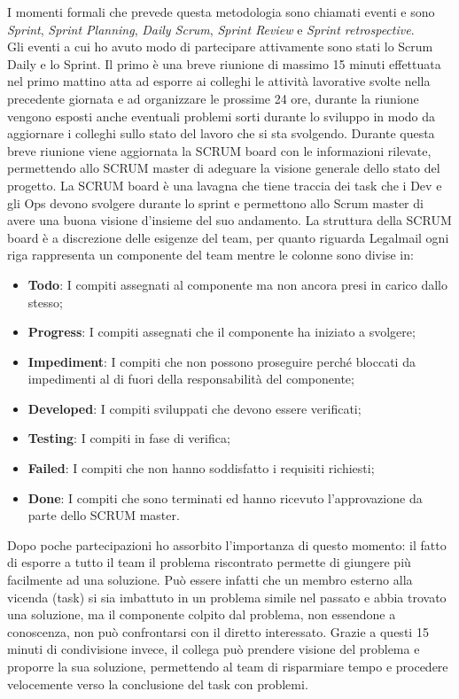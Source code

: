 I momenti formali che prevede questa metodologia sono chiamati eventi e sono \textit{Sprint}, \textit{Sprint Planning}, \textit{Daily Scrum}, \textit{Sprint Review} e \textit{Sprint retrospective}.\\
Gli eventi a cui ho avuto modo di partecipare attivamente sono stati lo Scrum Daily e lo Sprint. Il primo è una breve riunione di massimo 15 minuti effettuata nel primo mattino atta ad esporre ai colleghi le attività lavorative svolte nella precedente giornata e ad organizzare le prossime 24 ore, durante la riunione vengono esposti anche eventuali problemi sorti durante lo sviluppo in modo da aggiornare i colleghi sullo stato del lavoro che si sta svolgendo.
Durante questa breve riunione viene aggiornata la SCRUM board con le informazioni rilevate, permettendo allo SCRUM master di adeguare la visione generale dello stato del progetto.
La SCRUM board è una lavagna che tiene traccia dei \gls{task} che i Dev e gli Ops devono svolgere durante lo sprint e permettono allo Scrum master di avere una buona visione d'insieme del suo andamento. La struttura della SCRUM board è a discrezione delle esigenze del team, per quanto riguarda Legalmail ogni riga rappresenta un componente del team mentre le colonne sono divise in:
\begin{itemize}
	\item \textbf{Todo}: I compiti assegnati al componente ma non ancora presi in carico dallo stesso;
	\item \textbf{Progress}: I compiti assegnati che il componente ha iniziato a svolgere;
	\item \textbf{Impediment}: I compiti che non possono proseguire perché bloccati da impedimenti al di fuori della responsabilità del componente;
	\item \textbf{Developed}: I compiti sviluppati che devono essere verificati;
	\item \textbf{Testing}: I compiti in fase di verifica;
	\item \textbf{Failed}: I compiti che non hanno soddisfatto i requisiti richiesti;
	\item \textbf{Done}: I compiti che sono terminati ed hanno ricevuto l'approvazione da parte dello SCRUM master.
\end{itemize}
Dopo poche partecipazioni ho assorbito l'importanza di questo momento: il fatto di esporre a tutto il team il problema riscontrato permette di giungere più facilmente ad una soluzione. Può essere infatti che un membro esterno alla vicenda (\gls{task}) si sia imbattuto in un problema simile nel passato e abbia trovato una soluzione, ma il componente colpito dal problema, non essendone a conoscenza, non può confrontarsi con il diretto interessato. Grazie a questi 15 minuti di condivisione invece, il collega può prendere visione del problema e proporre la sua soluzione, permettendo al team di risparmiare tempo e procedere velocemente verso la conclusione del \gls{task} con problemi.

